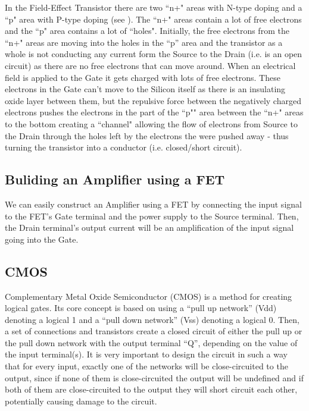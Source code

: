 In the Field-Effect Transistor there are two ``n+" areas with N-type doping and a ``p" area with P-type doping (see ). The
``n+" areas contain a lot of free electrons and the ``p" area contains a lot of
``holes". Initially, the free electrons from the ``n+" areas are moving into the holes in the ``p'' area and the transistor as a whole is not conducting  any current form the Source to the Drain (i.e. is an open circuit) as there are no free electrons that can move around. When an electrical field is applied to the Gate it gets charged with lots of free electrons. These electrons in the Gate can't move to the Silicon itself as there is an insulating oxide layer between them, but the repulsive force between the negatively charged electrons pushes the electrons in the part of the ``p"" area between the ``n+" areas to the bottom creating a ``channel" allowing the flow of electrons from Source to the Drain through the holes left by the electrons the were pushed away - thus turning the transistor into a conductor (i.e. closed/short circuit).

\subsection{Buliding an Amplifier using a FET}
We can easily construct an Amplifier using a FET by connecting the input signal to the FET's Gate terminal and the power supply to the Source terminal. Then, the Drain terminal's output current will be an amplification of the input signal going into the Gate.

\subsection{CMOS}
Complementary Metal Oxide Semiconductor (CMOS) is a method for creating logical gates. Its core concept is based on using a ``pull up network'' (Vdd) denoting a logical 1 and a ``pull down network'' (Vss) denoting a logical 0. Then, a set of connections and transistors create a closed circuit of either the pull up or the pull down network with the output terminal ``Q'', depending on the value of the input terminal(s). It is very important to design the circuit in such a way that for every input, exactly one of the networks will be close-circuited to the output, since if none of them is close-circuited the output will be undefined and if both of them are close-circuited to the output they will short circuit each other, potentially causing damage to the circuit.


